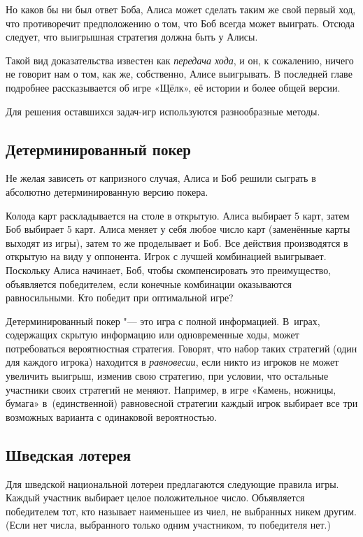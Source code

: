 \documentclass[twoside]{book}
\makeatletter
\newcommand{\rindex}[2][\imki@jobname]{%
\index[#1]{\detokenize{#2}}%
}
\makeatother
\begin{document}
Но каков бы ни был ответ Боба, Алиса может сделать таким же свой
первый ход, что противоречит предположению о том, что Боб всегда может
выиграть.
Отсюда следует, что выигрышная стратегия должна быть у
Алисы. \heart

Такой вид доказательства известен как \emph{передача хода}, и он, к сожалению, ничего не говорит нам о том, как же, собственно, Алисе выигрывать.
В последней главе подробнее рассказывается об игре «Щёлк», её истории и более общей версии.

\medskip

Для решения оставшихся задач-игр используются разнообразные методы.

\subsection*{Детерминированный покер}%
\rindex{Детерминированный покер}

Не желая зависеть от капризного случая, Алиса и Боб решили сыграть в
абсолютно детерминированную версию 
покера.

Колода карт раскладывается на столе в открытую.
Алиса выбирает 5 карт, затем Боб выбирает 5 карт.
Алиса меняет у себя любое число карт (заменённые карты выходят из игры),
затем то же проделывает и Боб.
Все действия производятся в открытую на виду у оппонента.
Игрок с лучшей комбинацией выигрывает.
Поскольку Алиса начинает, Боб, чтобы скомпенсировать это преимущество, объявляется победителем, если конечные комбинации оказываются равносильными.
Кто победит при оптимальной игре?

\medskip

Детерминированный покер "--- это игра с полной информацией.
В~играх, содержащих скрытую информацию или одновременные ходы, может потребоваться вероятностная стратегия.
Говорят, что набор таких стратегий (один для каждого игрока) находится в \emph{равновесии}, если никто из игроков не может увеличить выигрыш, изменив свою стратегию, при условии, что остальные участники своих стратегий не меняют.
Например, в игре «Камень, ножницы, бумага» в~(единственной) равновесной стратегии каждый игрок выбирает все три возможных варианта с одинаковой вероятностью.

\subsection*{Шведская лотерея}%
\rindex{Шведская лотерея}

Для шведской национальной лотереи предлагаются следующие правила игры. Каждый участник выбирает целое положительное число.
Объявляется победителем тот, кто называет наименьшее из чиел, не выбранных никем другим.
(Если нет числа, выбранного только одним участником, то победителя нет.)
\end{document}
